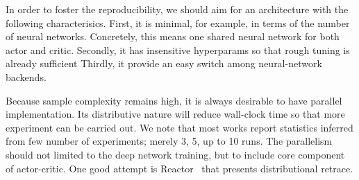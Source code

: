 In order to foster the reproducibility, we should aim for an architecture with the following characterisics.
First, it is minimal, for example, in terms of the number of neural networks.
Concretely, this means one shared neural network for both actor and critic.
Secondly, it has insensitive hyperparams so that rough tuning is already sufficient
Thirdly, it provide an easy switch among neural-network backends.

Because sample complexity remains high, it is always desirable to have parallel implementation.
Its distributive nature will reduce wall-clock time so that more experiment can be carried out.
We note that most works report statistics inferred from few number of experiments; merely 3, 5, up to 10 runs.
The parallelism should not limited to the deep network training, but to include core component of actor-critic.
One good attempt is Reactor~\cite{} that presents distributional retrace.
